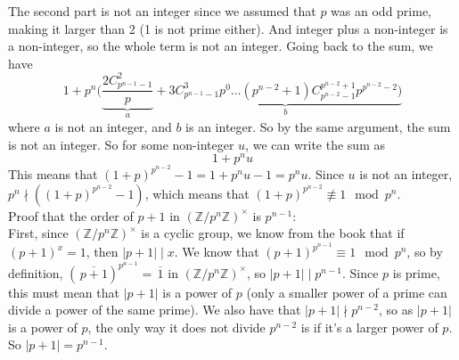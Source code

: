 \documentclass{article}
\newcommand{\Z}{\mathbb{Z}}
\newcommand{\olsi}[1]{\,\overline{\!{#1}}}
\begin{document}
    The second part is not an integer since we assumed that
    $p$ was an odd prime, making it larger than 2
    (1 is not prime either).
    And integer plus a non-integer is a non-integer,
    so the whole term is not an integer.
    Going back to the sum, we have 
    \[1 + p^n( \underbrace{\dfrac{ 2C_{p^{n-1} - 1}^{2}}{p}}_{a}
    + \underbrace{3C_{p^{n-1} - 1}^{3}p^{0} \dots
    (p^{n-2}+1)C_{p^{n-2} - 1}^{p^{n-2} + 1}p^{p^{n-2}-2})}_{b} \]
    where $a$ is not an integer, and $b$ is an integer.
    So by the same argument, the sum is not an integer.
    So for some non-integer $u$, we can write the sum as
    \[1 + p^nu\]
    This means that $(1 + p)^{p^{n-2}} - 1 = 1 + p^nu - 1
    = p^nu$.
    Since $u$ is not an integer, $p^n \nmid ((1 + p)^{p^{n-2}} - 1)$,
    which means that $(1 + p)^{p^{n-2}} \not\equiv 1 \mod p^n$. \\
    Proof that the order of $p + 1$
    in $(\Z/p^n\Z)^\times$ is $p^{n-1}$: \\
    First, since $(\Z/p^n\Z)^\times$ is a cyclic group,
    we know from the book that if $(p + 1)^x = 1$,
    then $|p + 1| \mid x$.
    We know that $(p + 1)^{p^{n-1}} \equiv 1 \mod p^n$,
    so by definition, $(\olsi{p + 1})^{p^{n-1}} = \olsi{1}$
    in $(\Z/p^n\Z)^\times$,
    so $|p + 1| \mid p^{n-1}$.
    Since $p$ is prime, this must mean that $|p+1|$ is a power of $p$
    (only a smaller power of a prime can divide a power of the same prime).
    We also have that $|p + 1| \nmid p^{n-2}$,
    so as $|p+1|$ is a power of $p$,
    the only way it does not divide $p^{n-2}$ is if it's
    a larger power of $p$.
    So $|p + 1| = p^{n-1}$.
\end{document}
